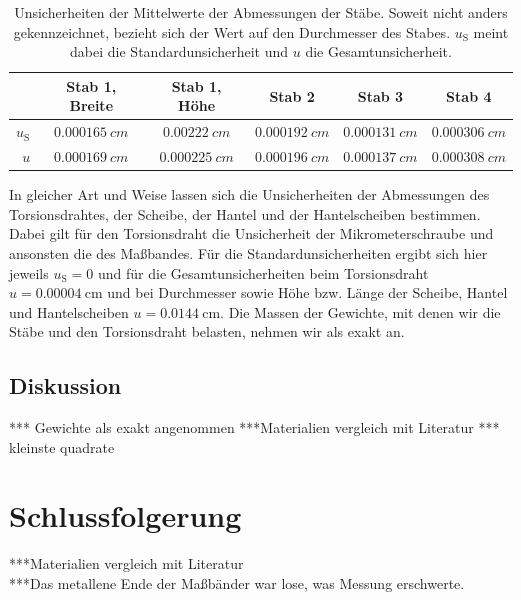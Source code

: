\documentclass[
	a4paper,
	12pt,
	pagesize,
	ngerman
]{scrartcl}
\begin{document}
	\begin{table}[H]
		\centering
		\begin{tabular}{ r | c | c | c | c | c |} 
			& Stab 1, Breite & Stab 1, Höhe  & Stab 2 & Stab 3 &  Stab 4 \\ \hline
			$ u_\text{S} $  & $\SI{0,000165}{cm}$ &  $\SI{0,00222}{cm}$ &  $\SI{0,000192}{cm}$ &  $\SI{0,000131}{cm}$ & $\SI{0,000306}{cm}$  \\ \hline
			$ u $ & $\SI{0,000169}{cm}$ & $\SI{0,000225}{cm}$ & $\SI{0,000196}{cm}$ & $\SI{0,000137}{cm}$ & $\SI{0,000308}{cm}$ \\ \hline
		\end{tabular}
		\caption{Unsicherheiten der Mittelwerte der Abmessungen der Stäbe. Soweit nicht anders gekennzeichnet, bezieht sich der Wert auf den Durchmesser des Stabes. $ u_\text{S} $ meint dabei die Standardunsicherheit und $ u $ die Gesamtunsicherheit.}
		\label{Stäbe_Abmesungen_Unsicherheiten}
	\end{table}
	In gleicher Art und Weise lassen sich die Unsicherheiten der Abmessungen des Torsionsdrahtes, der Scheibe, der Hantel und der Hantelscheiben bestimmen. Dabei gilt für den Torsionsdraht die Unsicherheit der Mikrometerschraube und ansonsten die des Maßbandes. Für die Standardunsicherheiten ergibt sich hier jeweils $u_\text{S}=0 $ und für die Gesamtunsicherheiten beim Torsionsdraht $ u=  \SI{0,00004}{\centi \meter}$ und bei Durchmesser sowie Höhe bzw. Länge der Scheibe, Hantel und Hantelscheiben $ u= \SI{0,0144}{\centi \meter}$.
	Die Massen der Gewichte, mit denen wir die Stäbe und den Torsionsdraht belasten, nehmen wir als exakt an.
	\subsection{Diskussion}
	*** Gewichte als exakt angenommen
	***Materialien vergleich mit Literatur
	*** kleinste quadrate
	
	\section{Schlussfolgerung}
	***Materialien vergleich mit Literatur \\
	***Das metallene Ende der Maßbänder war lose, was Messung erschwerte.
	
\end{document}
